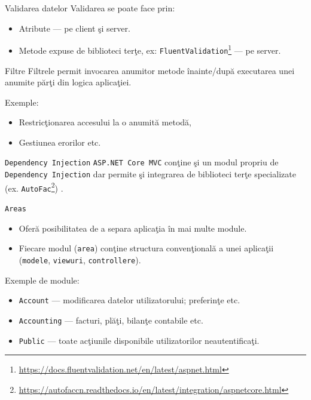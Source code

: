 \documentclass[presentation]{beamer}
\begin{document}
\begin{frame}[label={sec:org35b6770},fragile]{Validarea datelor}
 Validarea se poate face prin:
\begin{itemize}
\item Atribute --- pe client şi server.
\item Metode expuse de biblioteci terţe, ex: \texttt{FluentValidation}\footnote{\url{https://docs.fluentvalidation.net/en/latest/aspnet.html}} --- pe server.
\end{itemize}
\end{frame}
\begin{frame}[label={sec:org88867d8}]{Filtre}
Filtrele permit invocarea anumitor metode înainte/după executarea unei anumite părţi din logica aplicaţiei.

Exemple:
\begin{itemize}
\item Restricţionarea accesului la o anumită metodă,
\item Gestiunea erorilor etc.
\end{itemize}
\end{frame}
\begin{frame}[label={sec:org37c0273},fragile]{\texttt{Dependency Injection}}
 \texttt{ASP.NET Core MVC} conţine şi un modul propriu de \texttt{Dependency Injection} dar permite şi integrarea de biblioteci terţe specializate (ex. \texttt{AutoFac}\footnote{\url{https://autofaccn.readthedocs.io/en/latest/integration/aspnetcore.html}}) .
\end{frame}
\begin{frame}[label={sec:org17c73eb},fragile]{\texttt{Areas}}
 \begin{itemize}
\item Oferă posibilitatea de a separa aplicaţia în mai multe module.
\item Fiecare modul (\texttt{area}) conţine structura convenţională a unei aplicaţii (\texttt{modele}, \texttt{viewuri}, \texttt{controllere}).
\end{itemize}

Exemple de module:
\begin{itemize}
\item \texttt{Account} --- modificarea datelor utilizatorului; preferinţe etc.
\item \texttt{Accounting} --- facturi, plăţi, bilanţe contabile etc.
\item \texttt{Public} --- toate acţiunile disponibile utilizatorilor neautentificaţi.
\end{itemize}
\end{frame}
\end{document}
